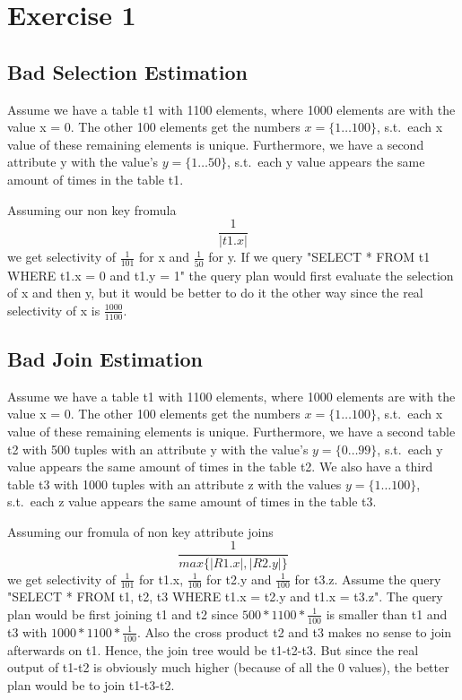 \documentclass{scrartcl}
\begin{document}
\section*{Exercise 1}

\subsection*{Bad Selection Estimation}
Assume we have a table t1 with 1100 elements, where 1000 elements are with the value x = 0. The other 100 elements get
the numbers $x = \{1\dots100\}$, s.t.\ each x value of these remaining elements is unique. Furthermore, we have a second
attribute y with the value's $y = \{1\dots50\}$, s.t.\ each y value appears the same amount of times in the table t1.

Assuming our non key fromula $$\frac{1}{|t1.x|}$$ we get selectivity of $\frac{1}{101}$ for x and $\frac{1}{50}$ for y.
If we query "SELECT * FROM t1 WHERE t1.x = 0 and t1.y = 1" the query plan would first evaluate the selection of x and
then y, but it would be better to do it the other way since the real selectivity of x is $\frac{1000}{1100}$.

\subsection*{Bad Join Estimation}
Assume we have a table t1 with 1100 elements, where 1000 elements are with the value x = 0. The other 100 elements get
the numbers $x = \{1\dots100\}$, s.t.\ each x value of these remaining elements is unique. Furthermore, we have a second
table t2 with 500 tuples with an attribute y with the value's $y = \{0\dots99\}$, s.t.\ each y value appears the same
amount of times in the table t2. We also have a third table t3 with 1000 tuples with an attribute z with the values
$y = \{1\dots100\}$, s.t.\ each z value appears the same amount of times in the table t3.


Assuming our fromula of non key attribute joins
$$\frac{1}{max\{|R1.x|, |R2.y|\}}$$ we get selectivity of $\frac{1}{101}$ for t1.x, $\frac{1}{100}$ for t2.y and
$\frac{1}{100}$ for t3.z. Assume the query "SELECT * FROM t1, t2, t3 WHERE t1.x = t2.y and t1.x = t3.z". The query plan
would be first joining t1 and t2 since $500*1100 * \frac{1}{100}$ is smaller than t1 and t3 with
$1000*1100 * \frac{1}{100}$. Also the cross product t2 and t3 makes no sense to join afterwards on t1.
Hence, the join tree would be t1-t2-t3. But since the real output of t1-t2 is obviously much higher (because of all
the 0 values), the better plan would be to join t1-t3-t2.
\end{document}
